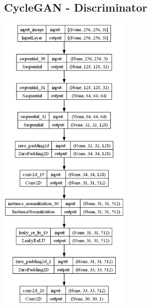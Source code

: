 \documentclass{article}
\begin{document}
\begin{multicols}{2}
\subsection{CycleGAN - Discriminator}
    \includegraphics[width=0.475\textwidth]{../imgs/cyclegan_discriminator.png}
\end{multicols}
\newpage
\end{document}
